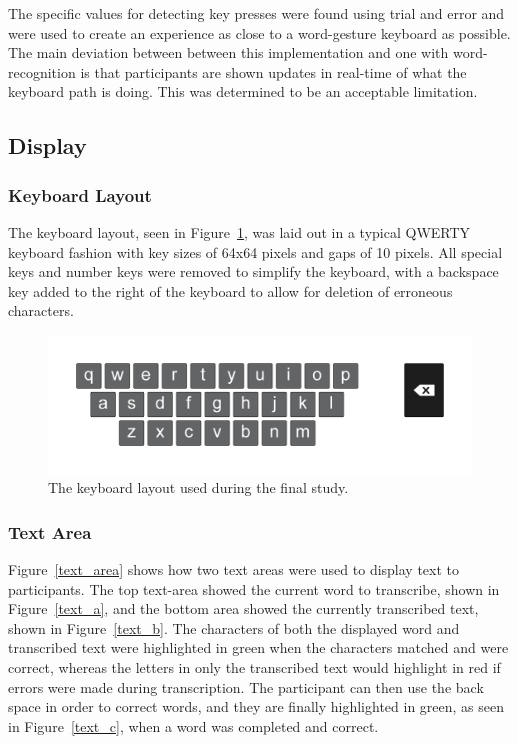 The specific values for detecting key presses were found using trial and error and were used to create an experience as close to a word-gesture keyboard as possible. The main deviation between between this implementation and one with word-recognition is that participants are shown updates in real-time of what the keyboard path is doing. This was determined to be an acceptable limitation.

\subsection{Display}

\subsubsection{Keyboard Layout}
The keyboard layout, seen in Figure~\ref{keyboard_layout}, was laid out in a typical QWERTY keyboard fashion with key sizes of 64x64 pixels and gaps of 10 pixels. All special keys and number keys were removed to simplify the keyboard, with a backspace key added to the right of the keyboard to allow for deletion of erroneous characters.

\begin{figure}[h]
	\centering
	\includegraphics[width=6in]{fig_final_keyboard}
	\caption[Display: Keyboard Layout]{The keyboard layout used during the final study.}
	\label{keyboard_layout}
\end{figure}

\subsubsection{Text Area}
Figure~\ref{text_area} shows how two text areas were used to display text to participants. The top text-area showed the current word to transcribe, shown in Figure~\ref{text_a}, and the bottom area showed the currently transcribed text, shown in Figure~\ref{text_b}. The characters of both the displayed word and transcribed text were highlighted in green when the characters matched and were correct, whereas the letters in only the transcribed text would highlight in red if errors were made during transcription. The participant can then use the back space in order to correct words, and they are finally highlighted in green, as seen in Figure~\ref{text_c}, when a word was completed and correct.

